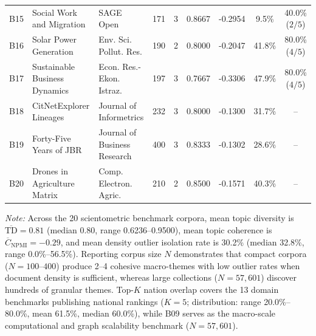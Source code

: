 \begin{table}[t]
{\begin{tabular}{llp{2.6cm}cccccc}
B15 & Social Work and Migration & SAGE Open & 171 & 3 & 0.8667 & -0.2954 & 9.5\% & 40.0\% ($2/5$) \\
B16 & Solar Power Generation & Env. Sci. Pollut. Res. & 190 & 2 & 0.8000 & -0.2047 & 41.8\% & 80.0\% ($4/5$) \\
B17 & Sustainable Business Dynamics & Econ. Res.-Ekon. Istraz. & 197 & 3 & 0.7667 & -0.3306 & 47.9\% & 80.0\% ($4/5$) \\
B18 & CitNetExplorer Lineages & Journal of Informetrics & 232 & 3 & 0.8000 & -0.1300 & 31.7\% & -- \\
B19 & Forty-Five Years of JBR & Journal of Business Research & 400 & 3 & 0.8333 & -0.1302 & 28.6\% & -- \\
B20 & Drones in Agriculture Matrix & Comp. Electron. Agric. & 210 & 2 & 0.8500 & -0.1571 & 40.3\% & -- \\
\hline
\end{tabular}%
}
\vspace{2pt}\par\raggedright\scriptsize\textit{Note:} Across the 20 scientometric benchmark corpora, mean topic diversity is $\overline{\text{TD}} = 0.81$ (median 0.80, range 0.6236--0.9500), mean topic coherence is $\overline{C}_{\text{NPMI}} = -0.29$, and mean density outlier isolation rate is 30.2\% (median 32.8\%, range 0.0\%--56.5\%). Reporting corpus size $N$ demonstrates that compact corpora ($N = 100\text{--}400$) produce 2--4 cohesive macro-themes with low outlier rates when document density is sufficient, whereas large collections ($N = 57{,}601$) discover hundreds of granular themes. Top-$K$ nation overlap covers the 13 domain benchmarks publishing national rankings ($K=5$; distribution: range 20.0\%--80.0\%, mean 61.5\%, median 60.0\%), while B09 serves as the macro-scale computational and graph scalability benchmark ($N=57{,}601$).
\end{table}
